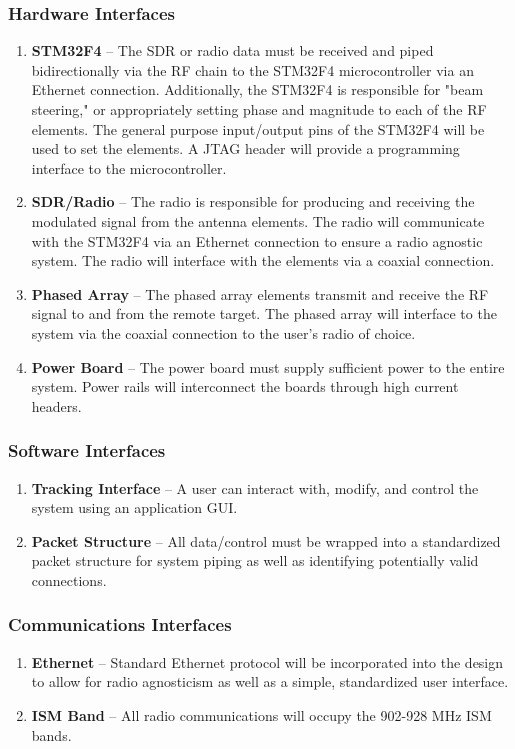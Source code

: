 \documentclass[ProductRequirements.tex]{subfiles}
\begin{document}
		\subsubsection{Hardware Interfaces}
			\begin{enumerate}\itemsep1pt
				\item \textbf{STM32F4} -- The SDR or radio data must be received and piped bidirectionally via the RF chain to the STM32F4 microcontroller via an Ethernet connection.  Additionally, the STM32F4 is responsible for "beam steering," or appropriately setting phase and magnitude to each of the RF elements.  The general purpose input/output pins of the STM32F4 will be used to set the elements. A JTAG header will provide a programming interface to the microcontroller.
				\item \textbf{SDR/Radio} -- The radio is responsible for producing and receiving the modulated signal from the antenna elements.  The radio will communicate with the STM32F4 via an Ethernet connection to ensure a radio agnostic system.  The radio will interface with the elements via a coaxial connection.  
				\item \textbf{Phased Array} -- The phased array elements transmit and receive the RF signal to and from the remote target.  The phased array will interface to the system via the coaxial connection to the user's radio of choice.
				\item \textbf{Power Board} -- The power board must supply sufficient power to the entire system.  Power rails will interconnect the boards through high current headers.
			\end{enumerate}
			
		\subsubsection{Software Interfaces}
			\begin{enumerate}\itemsep1pt
				\item \textbf{Tracking Interface} -- A user can interact with, modify, and control the system using an application GUI.
				\item \textbf{Packet Structure} -- All data/control must be wrapped into a standardized packet structure for system piping as well as identifying potentially valid connections.
			\end{enumerate}
			
		\subsubsection{Communications Interfaces}
			\begin{enumerate}\itemsep1pt
				\item \textbf{Ethernet} -- Standard Ethernet protocol will be incorporated into the design to allow for radio agnosticism as well as a simple, standardized user interface.
				\item \textbf{ISM Band} -- All radio communications will occupy the 902-928 MHz ISM bands.
			\end{enumerate}
			
\end{document}
